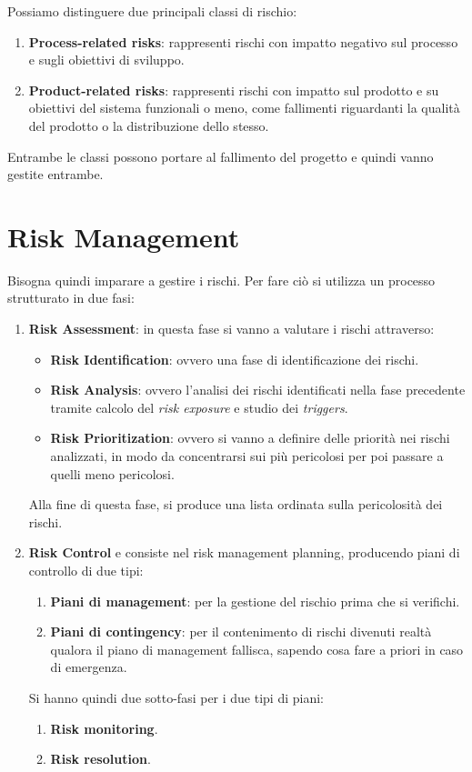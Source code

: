 Possiamo distinguere due principali classi di rischio:
\begin{enumerate}
    \item \textbf{Process-related risks}: rappresenti rischi con impatto
          negativo sul processo e sugli obiettivi di sviluppo.
    \item \textbf{Product-related risks}: rappresenti rischi con impatto sul
          prodotto e su obiettivi del sistema funzionali o meno, come fallimenti
          riguardanti la qualità del prodotto o la distribuzione dello stesso.
\end{enumerate}
Entrambe le classi possono portare al fallimento del progetto e quindi vanno gestite
entrambe.
\section{Risk Management}
Bisogna quindi imparare a gestire i rischi. Per fare ciò si utilizza un processo
strutturato in due fasi:
\begin{enumerate}
    \item \textbf{Risk Assessment}: in questa fase si vanno a valutare i rischi
          attraverso:
          \begin{itemize}
              \item \textbf{Risk Identification}: ovvero una fase di identificazione
                    dei rischi.
              \item \textbf{Risk Analysis}: ovvero l'analisi dei rischi identificati
                    nella fase precedente tramite calcolo del \textit{risk exposure} e
                    studio dei \textit{triggers}.
              \item \textbf{Risk Prioritization}: ovvero si vanno a definire delle
                    priorità nei rischi analizzati, in modo da concentrarsi sui più
                    pericolosi per poi passare a quelli meno pericolosi.
          \end{itemize}
          Alla fine di questa fase, si produce una lista ordinata sulla pericolosità
          dei rischi.
    \item \textbf{Risk Control} e consiste nel risk management planning, producendo
          piani di controllo di due tipi:
          \begin{enumerate}
              \item \textbf{Piani di management}: per la gestione del rischio prima che
                    si verifichi.
              \item \textbf{Piani di contingency}: per il contenimento di rischi divenuti
                    realtà qualora il piano di management fallisca, sapendo cosa fare a priori
                    in caso di emergenza.
          \end{enumerate}
          Si hanno quindi due sotto-fasi per i due tipi di piani:
          \begin{enumerate}
              \item \textbf{Risk monitoring}.
              \item \textbf{Risk resolution}.
          \end{enumerate}
\end{enumerate}
